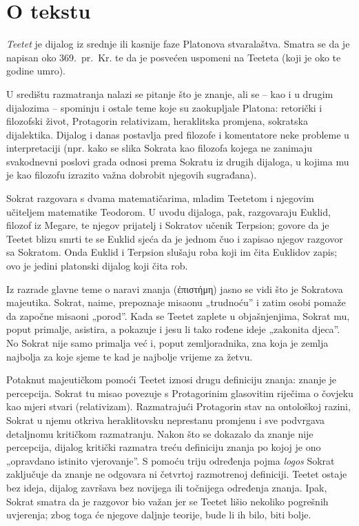 


\section*{O tekstu}

\textit{Teetet} je dijalog iz srednje ili kasnije faze Platonova stvaralaštva. Smatra se da je napisan oko 369.\ pr.~Kr. te da je posvećen uspomeni na Teeteta (koji je oko te godine umro).
 
U središtu razmatranja nalazi se pitanje što je znanje, ali se – kao i u drugim dijalozima – spominju i ostale teme koje su zaokupljale Platona: retorički i filozofski život, Protagorin relativizam, heraklitska promjena, sokratska dijalektika. Dijalog i danas postavlja pred filozofe i komentatore neke probleme u interpretaciji (npr. kako se slika Sokrata kao filozofa kojega ne zanimaju svakodnevni poslovi grada odnosi prema Sokratu iz drugih dijaloga, u kojima mu je kao filozofu izrazito važna dobrobit njegovih sugrađana). 

Sokrat razgovara s dvama matematičarima, mladim Teetetom i njegovim učiteljem matematike Teodorom. U uvodu dijaloga, pak, razgovaraju Euklid, filozof iz Megare, te njegov prijatelj i Sokratov učenik Terpsion; govore da je Teetet blizu smrti te se Euklid sjeća da je jednom čuo i zapisao njegov razgovor sa Sokratom. Onda Euklid i Terpsion slušaju roba koji im čita Euklidov zapis; ovo je jedini platonski dijalog koji čita rob.

Iz razrade glavne teme o naravi znanja (ἐπιστήμη) jasno se vidi što je Sokratova majeutika. Sokrat, naime, prepoznaje misaonu „trudnoću'' i zatim osobi pomaže da započne misaoni „porod''. Kada se Teetet zaplete u objašnjenjima, Sokrat mu, poput primalje, asistira, a pokazuje i jesu li tako rođene ideje „zakonita djeca''. No Sokrat nije samo primalja već i, poput zemljoradnika, zna koja je zemlja najbolja za koje sjeme te kad je najbolje vrijeme za žetvu.

Potaknut majeutičkom pomoći Teetet iznosi drugu definiciju znanja: znanje je percepcija. Sokrat tu misao povezuje s Protagorinim glasovitim riječima o čovjeku kao mjeri stvari (relativizam). Razmatrajući Protagorin stav na ontološkoj razini, Sokrat u njemu otkriva heraklitovsku neprestanu promjenu i sve podvrgava detaljnomu kritičkom razmatranju. Nakon što se dokazalo da znanje nije percepcija, dijalog kritički razmatra treću definiciju znanja po kojoj je ono „opravdano istinito vjerovanje''. S pomoću triju određenja pojma \textit{logos} Sokrat zaključuje da znanje ne odgovara ni četvrtoj razmotrenoj definiciji. Teetet ostaje bez ideja, dijalog završava bez novijega ili točnijega određenja znanja. Ipak, Sokrat smatra da je razgovor bio važan jer se Teetet lišio nekoliko pogrešnih uvjerenja; zbog toga će njegove daljnje teorije, bude li ih bilo, biti bolje.

